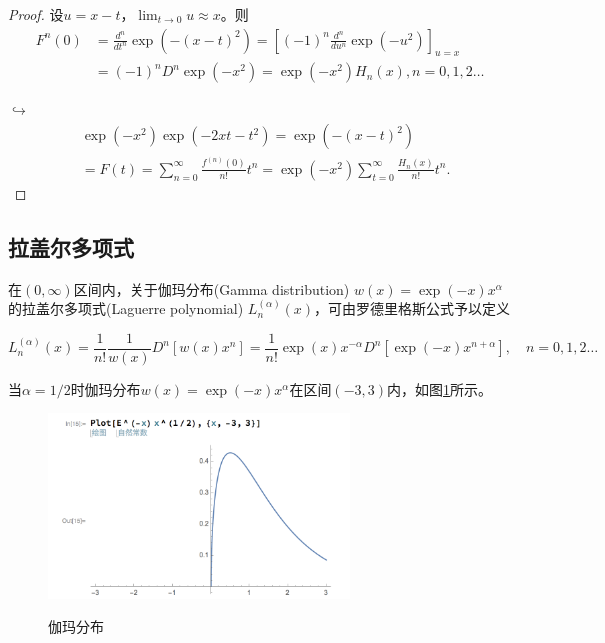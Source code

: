 \begin{subappendices}
\begin{proof}
  设$u=x-t$，$\lim_{t \rightarrow 0} u \approx x$。则
  \begin{equation*}
    \begin{split}
      F^{n}(0) &= \frac{d^n}{d t^n} \exp(-(x-t)^2) = \left[ (-1)^n \frac{d^n}{d u^n} \exp(-u^2) \right]_{u=x} \\
      &=(-1)^n D^n \exp(-x^2) = \exp(-x^2) H_n(x), n=0,1,2\ldots
    \end{split}
  \end{equation*}

  $\hookrightarrow$
  \begin{equation*}
    \begin{split}
      &\exp(-x^2) \exp(-2xt-t^2) = \exp(-(x-t)^2) \\
      &= F(t) = \sum_{n=0}^{\infty} \frac{f^{(n)}(0)}{n!} t^n = \exp(-x^2) \sum_{t=0}^{\infty} \frac{H_n(x)}{n!} t^n.
    \end{split}
  \end{equation*}
\end{proof}

\subsection{拉盖尔多项式}
\label{sec:poly-laguerre}
\begin{theorem}[拉盖尔多项式的罗德里格斯公式]
在$(0,\infty)$区间内，关于伽玛分布(Gamma distribution) $w(x) = \exp(-x) x^{\alpha}$的拉盖尔多项式(Laguerre polynomial) $L^{(\alpha)}_n(x)$，可由罗德里格斯公式予以定义

\begin{equation}
  \label{eq:poly-laguerre-rodrigues-formula}
  L^{(\alpha)}_n(x) = \frac{1}{n!} \frac{1}{w(x)} D^n \left[ w(x)x^n \right]= \frac{1}{n!} \exp(x) x^{-\alpha} D^n \left[ \exp(-x) x^{n+\alpha} \right], \quad n=0,1,2\ldots
\end{equation}
\end{theorem}
当$\alpha=1/2$时伽玛分布$w(x) = \exp (-x) x^{\alpha}$在区间$(-3,3)$内，如图\ref{fig:poly-gamma-distribution-example}所示。

\begin{figure}[htbp]
   \caption{伽玛分布}
  \centering
  \includegraphics[width=8cm]{./Figures/20170906-gamma-distri}
  \label{fig:poly-gamma-distribution-example}
%


\end{figure}
\end{subappendices}

